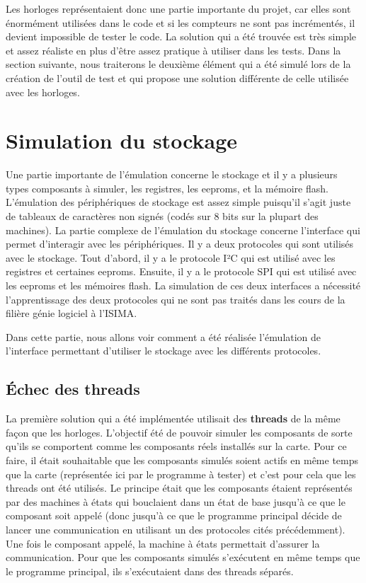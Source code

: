 \documentclass[a4paper]{article}
\begin{document}
Les horloges représentaient donc une partie importante du projet, car elles sont
énormément utilisées dans le code et si les compteurs ne sont pas incrémentés,
il devient impossible de tester le code. La solution qui a été trouvée est très
simple et assez réaliste en plus d'être assez pratique à utiliser dans les
tests. Dans la section suivante, nous traiterons le deuxième élément qui a été
simulé lors de la création de l'outil de test et qui propose une solution
différente de celle utilisée avec les horloges.
\section{Simulation du stockage}%

Une partie importante de l'émulation concerne le stockage et il y a plusieurs
types composants à simuler, les registres, les eeproms, et la mémoire flash.
L'émulation des périphériques de stockage est assez simple puisqu'il s'agit
juste de tableaux de caractères non signés (codés sur 8 bits sur la plupart des
machines). La partie complexe de l'émulation du stockage concerne l'interface
qui permet d'interagir avec les périphériques. Il y a deux protocoles qui sont
utilisés avec le stockage. Tout d'abord, il y a le protocole I²C qui est utilisé
avec les registres et certaines eeproms. Ensuite, il y a le protocole SPI qui est
utilisé avec les eeproms et les mémoires flash. La simulation de ces deux
interfaces a nécessité l'apprentissage des deux protocoles qui ne sont pas traités
dans les cours de la filière génie logiciel à l'ISIMA.

Dans cette partie, nous allons voir comment a été réalisée l'émulation de
l'interface permettant d'utiliser le stockage avec les différents protocoles.

\subsection{Échec des threads}%
\label{echecthread}

La première solution qui a été implémentée utilisait des \textbf{threads} de la
même façon que les horloges. L'objectif été de pouvoir simuler les composants de
sorte qu'ils se comportent comme les composants réels installés sur la
carte. Pour ce faire, il était souhaitable que les composants simulés soient actifs
en même temps que la carte (représentée ici par le programme à tester) et c'est
pour cela que les threads ont été utilisés. Le principe était que les composants
étaient représentés par des machines à états qui bouclaient dans un état de base
jusqu'à ce que le composant soit appelé (donc jusqu'à ce que le programme
principal décide de lancer une communication en utilisant un des protocoles
cités précédemment). Une fois le composant appelé, la machine à états permettait
d'assurer la communication. Pour que les composants simulés s'exécutent en même
temps que le programme principal, ils s'exécutaient dans des threads séparés.
\\
\end{document}
